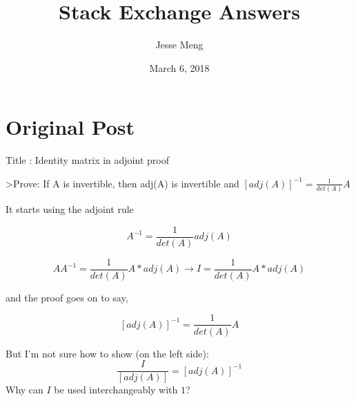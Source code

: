 \documentclass{article}
\title{Stack Exchange Answers}
\author{Jesse Meng }
\date{March 6, 2018}
\begin{document}
\maketitle

\section{Original Post}
Title : Identity matrix in adjoint proof

>Prove: If A is invertible, then adj(A) is invertible and $[adj(A)]^{-1}=\frac{1}{det(A)}A$

It starts using the adjoint rule

$$A^{-1}=\frac{1}{det(A)}adj(A)$$

$$AA^{-1}=\frac{1}{det(A)}A*adj(A)\longrightarrow I=\frac{1}{det(A)}A*adj(A)$$



and the proof goes on to say, 

$$[adj(A)]^{-1}=\frac{1}{det(A)}A$$

But I'm not sure how to show (on the left side): $$\frac{I}{[adj(A)]}=[adj(A)]^{-1}$$
Why can $I$ be used interchangeably with $1$?
\end{document}
